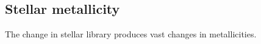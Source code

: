 \documentclass[onecolumn]{aa}
\begin{document}
% 

\subsection{Stellar metallicity}

The change in stellar library produces vast changes in metallicities.
\end{document}

